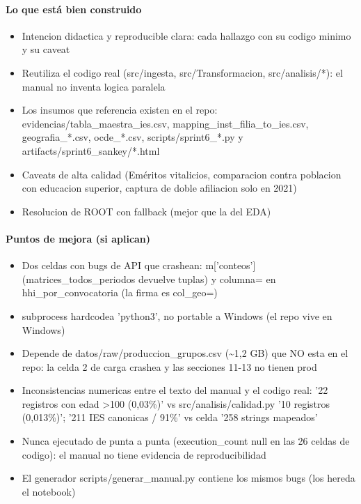 \paragraph{Lo que está bien construido}
\begin{itemize}
  \item Intencion didactica y reproducible clara: cada hallazgo con su codigo minimo y su caveat
  \item Reutiliza el codigo real (src/ingesta, src/Transformacion, src/analisis/*): el manual no inventa logica paralela
  \item Los insumos que referencia existen en el repo: evidencias/tabla\_maestra\_ies.csv, mapping\_inst\_filia\_to\_ies.csv, geografia\_*.csv, ocde\_*.csv, scripts/sprint6\_*.py y artifacts/sprint6\_sankey/*.html
  \item Caveats de alta calidad (Eméritos vitalicios, comparacion contra poblacion con educacion superior, captura de doble afiliacion solo en 2021)
  \item Resolucion de ROOT con fallback (mejor que la del EDA)
\end{itemize}

\paragraph{Puntos de mejora (si aplican)}
\begin{itemize}
  \item Dos celdas con bugs de API que crashean: m['conteos'] (matrices\_todos\_periodos devuelve tuplas) y columna= en hhi\_por\_convocatoria (la firma es col\_geo=)
  \item subprocess hardcodea 'python3', no portable a Windows (el repo vive en Windows)
  \item Depende de datos/raw/produccion\_grupos.csv (\textasciitilde{}1,2 GB) que NO esta en el repo: la celda 2 de carga crashea y las secciones 11-13 no tienen prod
  \item Inconsistencias numericas entre el texto del manual y el codigo real: '22 registros con edad >100 (0,03\%)' vs src/analisis/calidad.py '10 registros (0,013\%)'; '211 IES canonicas / 91\%' vs celda '258 strings mapeados'
  \item Nunca ejecutado de punta a punta (execution\_count null en las 26 celdas de codigo): el manual no tiene evidencia de reproducibilidad
  \item El generador scripts/generar\_manual.py contiene los mismos bugs (los hereda el notebook)
\end{itemize}

